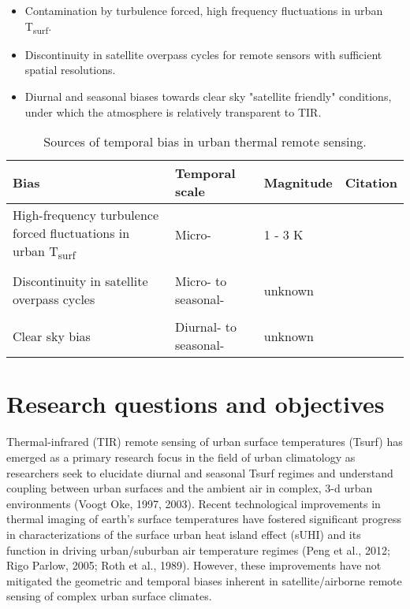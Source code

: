 \begin{itemize}
	\item Contamination by turbulence forced, high frequency fluctuations in urban T\textsubscript{surf}.
	\item Discontinuity in satellite overpass cycles for remote sensors with sufficient spatial resolutions.
	\item Diurnal and seasonal biases towards clear sky "satellite friendly" conditions, under which the atmosphere is relatively transparent to TIR.
\end{itemize}

\begin{table}[H]
	\centering
	\caption{Sources of temporal bias in urban thermal remote sensing.}
	\label{tbias}
	\begin{tabular*}{\textwidth}{p{6cm}p{1.5cm}p{3cm}p{3cm}}
		\toprule 
		Bias & Temporal scale & Magnitude & Citation  \\  
		\midrule
		High-frequency turbulence forced fluctuations in urban T\textsubscript{surf} & Micro- & 1 - 3 \si{\kelvin} & \citep{Christen2012} \\
		&&&\\
		Discontinuity in satellite overpass cycles & Micro- to seasonal- & unknown & \\
		&&&\\
		Clear sky bias & Diurnal- to seasonal- & unknown & \\
		\bottomrule
	\end{tabular*} 
\end{table}


 
\section{Research questions and objectives}

Thermal-infrared (TIR) remote sensing of urban surface temperatures (Tsurf) has emerged as a primary research focus in the field of urban climatology as researchers seek to elucidate diurnal and seasonal Tsurf regimes and understand coupling between urban surfaces and the ambient air in complex, 3-d urban environments (Voogt  Oke, 1997, 2003). Recent technological improvements in thermal imaging of earth’s surface temperatures have fostered significant progress in characterizations of the surface urban heat island effect (sUHI) and its function in driving urban/suburban air temperature regimes (Peng et al., 2012; Rigo  Parlow, 2005; Roth et al., 1989). However, these improvements have not mitigated the geometric and temporal biases inherent in satellite/airborne remote sensing of complex urban surface climates. 

